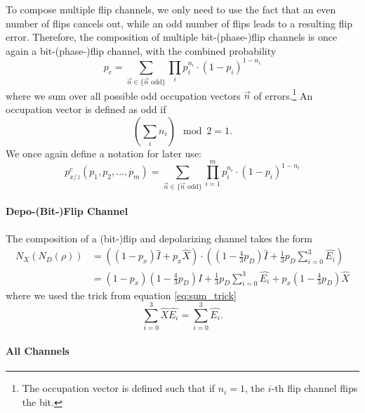 To compose multiple flip channels, we only need to use the fact that an even number of flips cancels out, while an odd number of flips leads to a resulting flip error.
Therefore, the composition of multiple bit-(phase-)flip channels is once again a bit-(phase-)flip channel, with the combined probability
\begin{equation*}
    p_c = \sum_{\vec{n}\in\{\vec{n} \text{ odd}\}} \prod_i p_i^{n_i} \cdot \left( 1-p_i\right)^{1-n_i}
\end{equation*}
where we sum over all possible odd occupation vectors $\vec{n}$ of errors.\footnote{The occupation vector is defined such that if $n_i = 1$, the $i$-th flip channel flips the bit.}
An occupation vector is defined as odd if
\begin{equation*}
    \left(\sum_i n_i\right) \mod 2 = 1.
\end{equation*}
We once again define a notation for later use:
\begin{equation}
    p_{x/z}^c(p_1,p_2,...,p_m) = \sum_{\vec{n}\in\{\vec{n} \text{ odd}\}} \prod_{i=1}^m p_i^{n_i} \cdot \left( 1-p_i\right)^{1-n_i}
    \label{eq:composition_flip_channel}
\end{equation}



\paragraph*{Depo-(Bit-)Flip Channel}

The composition of a (bit-)flip and depolarizing channel takes the form
\begin{align*}
    N_{X}(N_{D}(\rho)) &= \left( (1-p_x) \hat{I} + p_x \hat{X}\right)
    \cdot \left( \left(1-\frac{4}{3}p_D\right) \hat{I} + \frac{1}{3} p_D \sum_{i=0}^{3}\hat{E_i} \right) \\
    &= (1-p_x)\left(1-\frac{4}{3}p_D\right) \hat{I} + \frac{1}{3} p_D \sum_{i=0}^{3}\hat{E_i}  + p_x\left(1-\frac{4}{3}p_D\right) \hat{X}
\end{align*}
where we used the trick from equation \eqref{eq:sum_trick}
\begin{equation*}
    \sum_{i=0}^{3} \hat{X}\hat{E_i} = 
    \sum_{i=0}^{3} \hat{E_i}. 
\end{equation*}


\paragraph*{All Channels}\label{para:composition_all_possible_channels}


